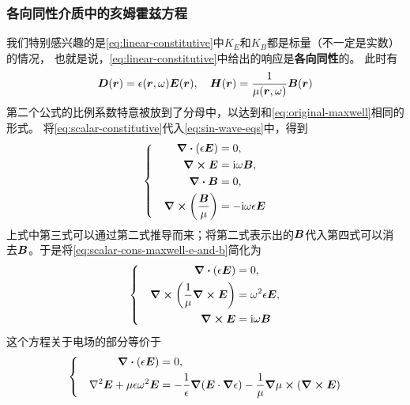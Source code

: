 \documentclass[UTF8, a4paper]{ctexart}
\newcommand*{\ii}{\mathrm{i}}
\newenvironment{bigcase}{\left\{\quad\begin{aligned}}{\end{aligned}\right.}
\begin{document}
\subsubsection{各向同性介质中的亥姆霍兹方程}

我们特别感兴趣的是\eqref{eq:linear-constitutive}中$K_E$和$K_B$都是标量（不一定是实数）的情况，
也就是说，\eqref{eq:linear-constitutive}中给出的响应是\textbf{各向同性}的。
此时有
\begin{equation}
    \vb*{D}(\vb*{r}) = \epsilon(\vb*{r}, \omega) \vb*{E}(\vb*{r}), \quad \vb*{H}(\vb*{r}) = \frac{1}{\mu(\vb*{r}, \omega)} \vb*{B}(\vb*{r})
    \label{eq:scalar-constitutive}
\end{equation}
第二个公式的比例系数特意被放到了分母中，以达到和\eqref{eq:original-maxwell}相同的形式。
将\eqref{eq:scalar-constitutive}代入\eqref{eq:sin-wave-eqs}中，得到
\begin{equation}
    \begin{bigcase}
        \div{(\epsilon \vb*{E})} &= 0, \\
        \curl{\vb*{E}} &= \ii \omega \vb*{B}, \\
        \div{\vb*{B}} &= 0, \\
        \curl{\left(\frac{\vb*{B}}{\mu}\right)} &= - \ii \omega \epsilon \vb*{E}
    \end{bigcase}
    \label{eq:scalar-cons-maxwell-e-and-b}
\end{equation}
上式中第三式可以通过第二式推导而来；将第二式表示出的$\vb*{B}$代入第四式可以消去$\vb*{B}$。于是将\eqref{eq:scalar-cons-maxwell-e-and-b}简化为
\begin{equation}
    \begin{bigcase}
        \div{(\epsilon \vb*{E})} &= 0, \\
        \curl{ \left(\frac{1}{\mu} \curl{\vb*{E}} \right) } &= \omega^2 \epsilon \vb*{E}, \\
        \curl{\vb*{E}} &= \ii \omega \vb*{B}
    \end{bigcase}
    \label{eq:e-in-material}
\end{equation}
这个方程关于电场的部分等价于
\[
    \begin{bigcase}
        \div{(\epsilon \vb*{E})} &= 0, \\
        \laplacian \vb*{E} + \mu \epsilon \omega^2 \vb*{E} &= - \frac{1}{\epsilon} \grad{(\vb*{E} \cdot \grad{\epsilon})} - \frac{1}{\mu} \grad{\mu} \cross (\curl{\vb*{E}})
    \end{bigcase}
\]
\end{document}
